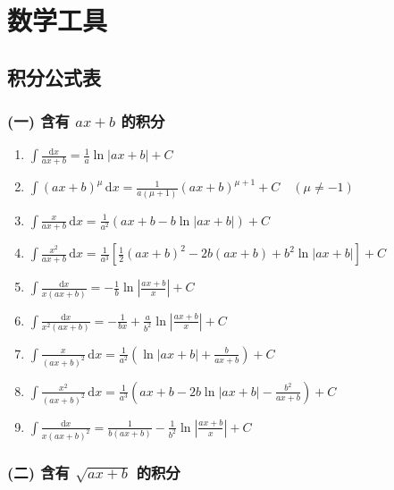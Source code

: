 \appendix
\chapter{数学工具}

\section{积分公式表}

\subsection*{(一) 含有 $ax + b$ 的积分}

\begin{enumerate}
    \item $\displaystyle \int \frac{\mathrm{d}x}{ax + b} = \frac{1}{a} \ln |ax + b| + C$
    \item $\displaystyle \int (ax + b)^\mu \, \mathrm{d}x = \frac{1}{a(\mu + 1)} (ax + b)^{\mu + 1} + C \quad (\mu \neq -1)$
    \item $\displaystyle \int \frac{x}{ax + b} \, \mathrm{d}x = \frac{1}{a^2} \left( ax + b - b \ln |ax + b| \right) + C$
    \item $\displaystyle \int \frac{x^2}{ax + b} \, \mathrm{d}x = \frac{1}{a^3} \left[ \frac{1}{2} (ax + b)^2 - 2b(ax + b) + b^2 \ln |ax + b| \right] + C$
    \item $\displaystyle \int \frac{\mathrm{d}x}{x(ax + b)} = -\frac{1}{b} \ln \left| \frac{ax + b}{x} \right| + C$
    \item $\displaystyle \int \frac{\mathrm{d}x}{x^2(ax + b)} = -\frac{1}{bx} + \frac{a}{b^2} \ln \left| \frac{ax + b}{x} \right| + C$
    \item $\displaystyle \int \frac{x}{(ax + b)^2} \, \mathrm{d}x = \frac{1}{a^2} \left( \ln |ax + b| + \frac{b}{ax + b} \right) + C$
    \item $\displaystyle \int \frac{x^2}{(ax + b)^2} \, \mathrm{d}x = \frac{1}{a^3} \left( ax + b - 2b \ln |ax + b| - \frac{b^2}{ax + b} \right) + C$
    \item $\displaystyle \int \frac{\mathrm{d}x}{x(ax + b)^2} = \frac{1}{b(ax + b)} - \frac{1}{b^2} \ln \left| \frac{ax + b}{x} \right| + C$
\end{enumerate}

\subsection*{(二) 含有 $\sqrt{ax + b}$ 的积分}

